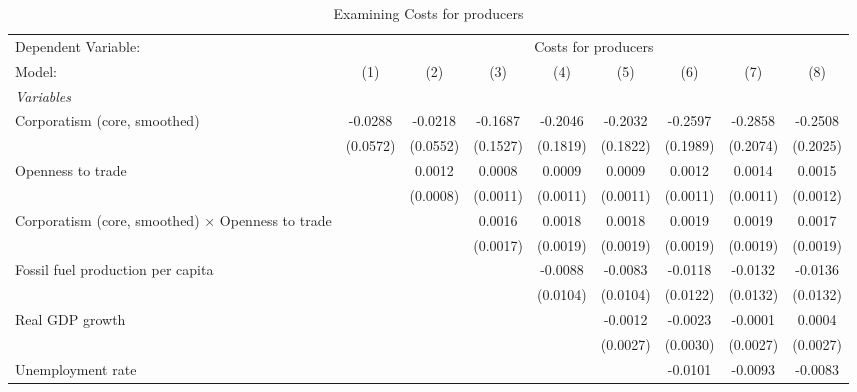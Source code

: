 
\begin{table}[htbp]
   \caption{Examining Costs for producers}
   \centering
   \begin{tabular}{lcccccccc}
      \tabularnewline \midrule \midrule
      Dependent Variable: & \multicolumn{8}{c}{Costs for producers}\\
      Model:                                                   & (1)      & (2)      & (3)      & (4)      & (5)      & (6)      & (7)      & (8)\\  
      \midrule
      \emph{Variables}\\
      Corporatism (core, smoothed)                             & -0.0288  & -0.0218  & -0.1687  & -0.2046  & -0.2032  & -0.2597  & -0.2858  & -0.2508\\   
                                                               & (0.0572) & (0.0552) & (0.1527) & (0.1819) & (0.1822) & (0.1989) & (0.2074) & (0.2025)\\   
      Openness to trade                                        &          & 0.0012   & 0.0008   & 0.0009   & 0.0009   & 0.0012   & 0.0014   & 0.0015\\   
                                                               &          & (0.0008) & (0.0011) & (0.0011) & (0.0011) & (0.0011) & (0.0011) & (0.0012)\\   
      Corporatism (core, smoothed) $\times$ Openness to trade  &          &          & 0.0016   & 0.0018   & 0.0018   & 0.0019   & 0.0019   & 0.0017\\   
                                                               &          &          & (0.0017) & (0.0019) & (0.0019) & (0.0019) & (0.0019) & (0.0019)\\   
      Fossil fuel production per capita                        &          &          &          & -0.0088  & -0.0083  & -0.0118  & -0.0132  & -0.0136\\   
                                                               &          &          &          & (0.0104) & (0.0104) & (0.0122) & (0.0132) & (0.0132)\\   
      Real GDP growth                                          &          &          &          &          & -0.0012  & -0.0023  & -0.0001  & 0.0004\\   
                                                               &          &          &          &          & (0.0027) & (0.0030) & (0.0027) & (0.0027)\\   
      Unemployment rate                                        &          &          &          &          &          & -0.0101  & -0.0093  & -0.0083\\   

\end{tabular}
\end{table}
